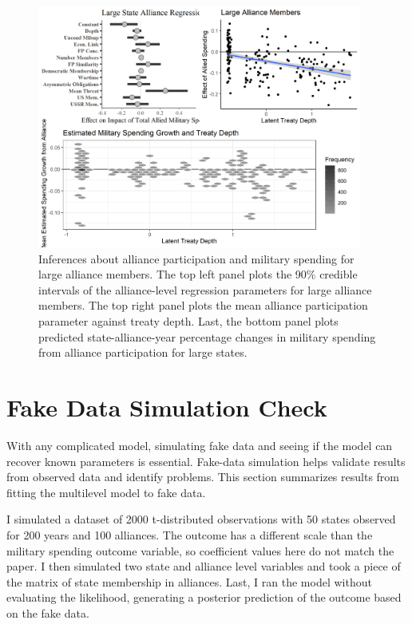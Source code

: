 \documentclass[12pt]{article}
\begin{document}
\begin{figure}[htbp]
	\centering
		\includegraphics[width=0.95\textwidth]{lg-res.png}
	\caption{Inferences about alliance participation and military spending for large alliance members. The top left panel plots the 90\% credible intervals of the alliance-level regression parameters for large alliance members. The top right panel plots the mean alliance participation parameter against treaty depth. Last, the bottom panel plots predicted state-alliance-year percentage changes in military spending from alliance participation for large states.}
	\label{fig:lg-res}
\end{figure}



\section{Fake Data Simulation Check}


With any complicated model, simulating fake data and seeing if the model can recover known parameters is essential. 
Fake-data simulation helps validate results from observed data and identify problems. 
This section summarizes results from fitting the multilevel model to fake data.


I simulated a dataset of 2000 t-distributed observations with 50 states observed for 200 years and 100 alliances. 
The outcome has a different scale than the military spending outcome variable, so coefficient values here do not match the paper.  
I then simulated two state and alliance level variables and took a piece of the matrix of state membership in alliances. 
Last, I ran the model without evaluating the likelihood, generating a posterior prediction of the outcome based on the fake data.
\end{document}
